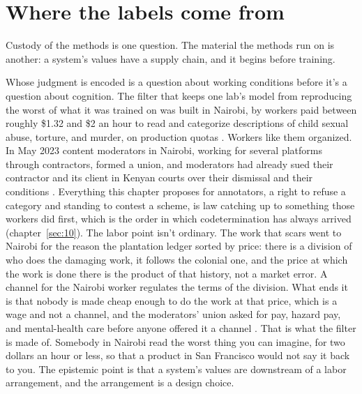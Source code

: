 \section{Where the labels come from}
\label{sec:23.3}
Custody of the methods is one question. The material the methods run on is another: a system's values have a supply chain, and it begins before training.

Whose judgment is encoded is a question about working conditions before it's a question about cognition. The filter that keeps one lab's model from reproducing the worst of what it was trained on was built in Nairobi, by workers paid between roughly \$1.32 and \$2 an hour to read and categorize descriptions of child sexual abuse, torture, and murder, on production quotas \autocite{perrigo2023openai}. Workers like them organized. In May 2023 content moderators in Nairobi, working for several platforms through contractors, formed a union, and moderators had already sued their contractor and its client in Kenyan courts over their dismissal and their conditions \autocite{madung2023union,trf2023moderators}. Everything this chapter proposes for annotators, a right to refuse a category and standing to contest a scheme, is law catching up to something those workers did first, which is the order in which codetermination has always arrived (chapter~\ref{sec:10}). The labor point isn't ordinary. The work that scars went to Nairobi for the reason the plantation ledger sorted by price: there is a division of who does the damaging work, it follows the colonial one, and the price at which the work is done there is the product of that history, not a market error. A channel for the Nairobi worker regulates the terms of the division. What ends it is that nobody is made cheap enough to do the work at that price, which is a wage and not a channel, and the moderators' union asked for pay, hazard pay, and mental-health care before anyone offered it a channel \autocite{trf2023moderators}. That is what the filter is made of. Somebody in Nairobi read the worst thing you can imagine, for two dollars an hour or less, so that a product in San Francisco would not say it back to you. The epistemic point is that a system's values are downstream of a labor arrangement, and the arrangement is a design choice.

